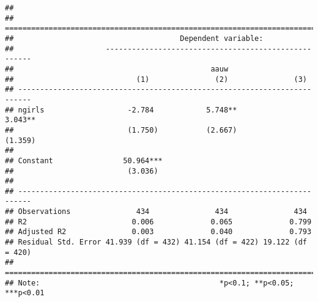 \documentclass[
]{article}
\newenvironment{Shaded}{\begin{snugshade}}{\end{snugshade}}
\newcommand{\AttributeTok}[1]{\textcolor[rgb]{0.13,0.29,0.53}{#1}}
\newcommand{\ConstantTok}[1]{\textcolor[rgb]{0.56,0.35,0.01}{#1}}
\newcommand{\FloatTok}[1]{\textcolor[rgb]{0.00,0.00,0.81}{#1}}
\newcommand{\FunctionTok}[1]{\textcolor[rgb]{0.13,0.29,0.53}{\textbf{#1}}}
\newcommand{\NormalTok}[1]{#1}
\newcommand{\OtherTok}[1]{\textcolor[rgb]{0.56,0.35,0.01}{#1}}
\newcommand{\SpecialCharTok}[1]{\textcolor[rgb]{0.81,0.36,0.00}{\textbf{#1}}}
\newcommand{\StringTok}[1]{\textcolor[rgb]{0.31,0.60,0.02}{#1}}
\begin{document}
\begin{Shaded}
\end{Shaded}

\begin{verbatim}
## 
## =========================================================================
##                                      Dependent variable:                 
##                     -----------------------------------------------------
##                                             aauw                         
##                            (1)               (2)               (3)       
## -------------------------------------------------------------------------
## ngirls                   -2.784            5.748**           3.043**     
##                          (1.750)           (2.667)           (1.359)     
##                                                                          
## Constant                50.964***                                        
##                          (3.036)                                         
##                                                                          
## -------------------------------------------------------------------------
## Observations               434               434               434       
## R2                        0.006             0.065             0.799      
## Adjusted R2               0.003             0.040             0.793      
## Residual Std. Error 41.939 (df = 432) 41.154 (df = 422) 19.122 (df = 420)
## =========================================================================
## Note:                                         *p<0.1; **p<0.05; ***p<0.01
\end{verbatim}
\end{document}

